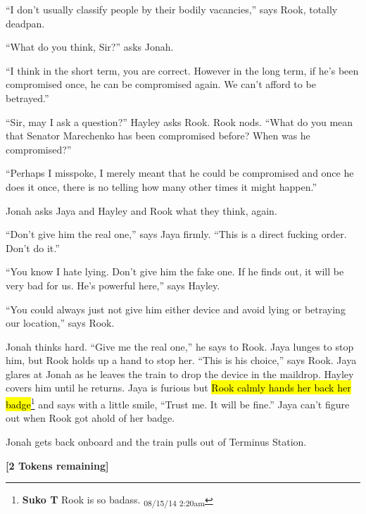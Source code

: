 ``I don't usually classify people by their bodily vacancies,'' says Rook, totally deadpan.

``What do you think, Sir?'' asks Jonah.

``I think in the short term, you are correct.  However in the long term, if he's been compromised once, he can be compromised again.  We can't afford to be betrayed.''

``Sir, may I ask a question?'' Hayley asks Rook.  Rook nods.  ``What do you mean that Senator Marechenko has been compromised before?  When was he compromised?''

``Perhaps I misspoke, I merely meant that he could be compromised and once he does it once, there is no telling how many other times it might happen.''

Jonah asks Jaya and Hayley and Rook what they think, again.

``Don't give him the real one,'' says Jaya firmly.  ``This is a direct fucking order.  Don't do it.''

``You know I hate lying.  Don't give him the fake one.  If he finds out, it will be very bad for us.  He's powerful here,'' says Hayley. 

``You could always just not give him either device and avoid lying or betraying our location,'' says Rook.

Jonah thinks hard.  ``Give me the real one,'' he says to Rook.  Jaya lunges to stop him, but Rook holds up a hand to stop her.  ``This is his choice,'' says Rook.  Jaya glares at Jonah as he leaves the train to drop the device in the maildrop.  Hayley covers him until he returns.  Jaya is furious but \hl{Rook calmly hands her back her badge}\footnote{\textbf{Suko T }Rook is so badass. \textsubscript{08/15/14 2:20am}} and says with a little smile, ``Trust me. It will be fine.''  Jaya can't figure out when Rook got ahold of her badge.



Jonah gets back onboard and the train pulls out of Terminus Station.



\textbf{{[}2 Tokens remaining{]}}







